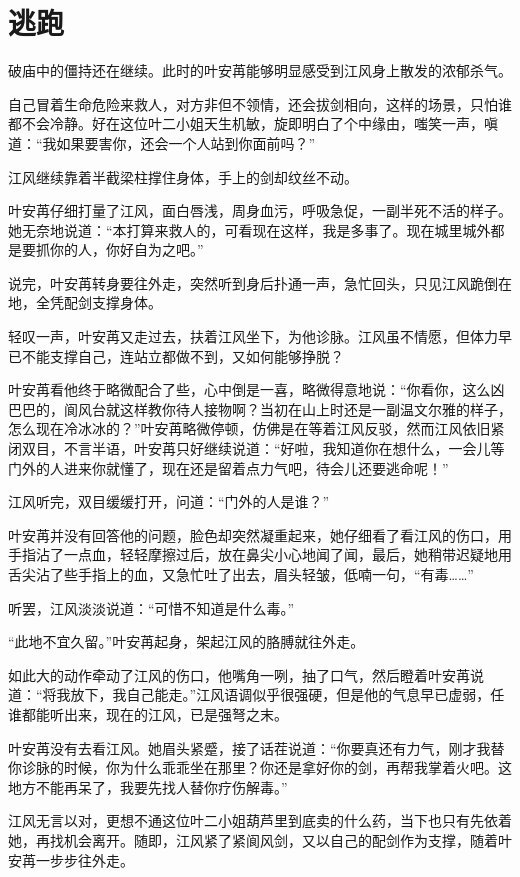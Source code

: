 \chapter{逃跑}
破庙中的僵持还在继续。此时的叶安苒能够明显感受到江风身上散发的浓郁杀气。

自己冒着生命危险来救人，对方非但不领情，还会拔剑相向，这样的场景，只怕谁都不会冷静。好在这位叶二小姐天生机敏，旋即明白了个中缘由，嗤笑一声，嗔道：“我如果要害你，还会一个人站到你面前吗？”

江风继续靠着半截梁柱撑住身体，手上的剑却纹丝不动。

叶安苒仔细打量了江风，面白唇浅，周身血污，呼吸急促，一副半死不活的样子。她无奈地说道：“本打算来救人的，可看现在这样，我是多事了。现在城里城外都是要抓你的人，你好自为之吧。”

说完，叶安苒转身要往外走，突然听到身后扑通一声，急忙回头，只见江风跪倒在地，全凭配剑支撑身体。

轻叹一声，叶安苒又走过去，扶着江风坐下，为他诊脉。江风虽不情愿，但体力早已不能支撑自己，连站立都做不到，又如何能够挣脱？

叶安苒看他终于略微配合了些，心中倒是一喜，略微得意地说：“你看你，这么凶巴巴的，阆风台就这样教你待人接物啊？当初在山上时还是一副温文尔雅的样子，怎么现在冷冰冰的？”叶安苒略微停顿，仿佛是在等着江风反驳，然而江风依旧紧闭双目，不言半语，叶安苒只好继续说道：“好啦，我知道你在想什么，一会儿等门外的人进来你就懂了，现在还是留着点力气吧，待会儿还要逃命呢！”

江风听完，双目缓缓打开，问道：“门外的人是谁？”

叶安苒并没有回答他的问题，脸色却突然凝重起来，她仔细看了看江风的伤口，用手指沾了一点血，轻轻摩擦过后，放在鼻尖小心地闻了闻，最后，她稍带迟疑地用舌尖沾了些手指上的血，又急忙吐了出去，眉头轻皱，低喃一句，“有毒……”

听罢，江风淡淡说道：“可惜不知道是什么毒。”

“此地不宜久留。”叶安苒起身，架起江风的胳膊就往外走。

如此大的动作牵动了江风的伤口，他嘴角一咧，抽了口气，然后瞪着叶安苒说道：“将我放下，我自己能走。”江风语调似乎很强硬，但是他的气息早已虚弱，任谁都能听出来，现在的江风，已是强弩之末。

叶安苒没有去看江风。她眉头紧蹙，接了话茬说道：“你要真还有力气，刚才我替你诊脉的时候，你为什么乖乖坐在那里？你还是拿好你的剑，再帮我掌着火吧。这地方不能再呆了，我要先找人替你疗伤解毒。”

江风无言以对，更想不通这位叶二小姐葫芦里到底卖的什么药，当下也只有先依着她，再找机会离开。随即，江风紧了紧阆风剑，又以自己的配剑作为支撑，随着叶安苒一步步往外走。

